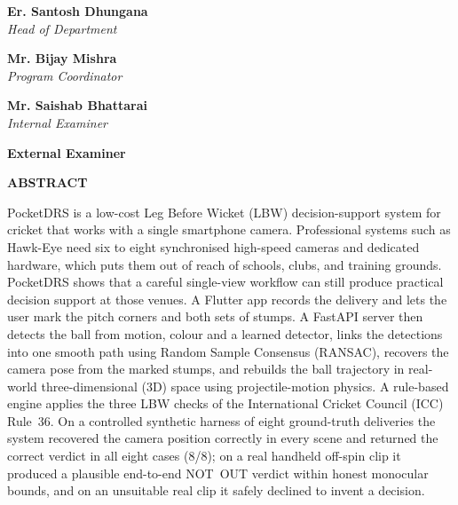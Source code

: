 \documentclass[12pt,a4paper]{report}
\begin{document}
\vspace{2cm}
\noindent
\begin{minipage}[t]{0.49\textwidth}
\textbf{Er. Santosh Dhungana}\\
\textit{Head of Department}
\end{minipage}\hfill
\begin{minipage}[t]{0.49\textwidth}\raggedleft
\textbf{Mr. Bijay Mishra}\\
\textit{Program Coordinator}
\end{minipage}

\vspace{1.8cm}
\noindent
\begin{minipage}[t]{0.49\textwidth}
\textbf{Mr. Saishab Bhattarai}\\
\textit{Internal Examiner}
\end{minipage}\hfill
\begin{minipage}[t]{0.49\textwidth}\raggedleft
\textbf{External Examiner}
\end{minipage}

\clearpage

\begin{center}\textbf{\fontsize{16}{19}\selectfont ABSTRACT}\end{center}
\vspace{0.5cm}

PocketDRS is a low-cost Leg Before Wicket (LBW) decision-support system for cricket that works with a single smartphone camera. Professional systems such as Hawk-Eye need six to eight synchronised high-speed cameras and dedicated hardware, which puts them out of reach of schools, clubs, and training grounds. PocketDRS shows that a careful single-view workflow can still produce practical decision support at those venues. A Flutter app records the delivery and lets the user mark the pitch corners and both sets of stumps. A FastAPI server then detects the ball from motion, colour and a learned detector, links the detections into one smooth path using Random Sample Consensus (RANSAC), recovers the camera pose from the marked stumps, and rebuilds the ball trajectory in real-world three-dimensional (3D) space using projectile-motion physics. A rule-based engine applies the three LBW checks of the International Cricket Council (ICC) Rule~36. On a controlled synthetic harness of eight ground-truth deliveries the system recovered the camera position correctly in every scene and returned the correct verdict in all eight cases (8/8); on a real handheld off-spin clip it produced a plausible end-to-end NOT~OUT verdict within honest monocular bounds, and on an unsuitable real clip it safely declined to invent a decision.
\end{document}
